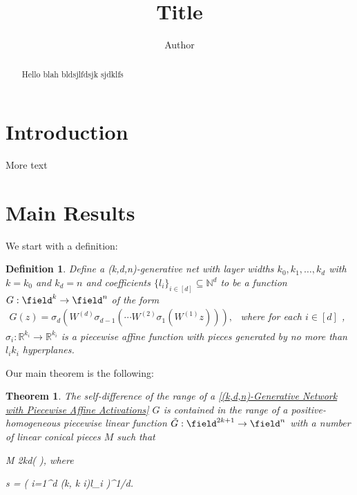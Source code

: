 \documentclass{article}
\title{Title}
\author{Author}
\newtheorem{theorem}{Theorem}
\newtheorem{definition}{Definition}
\begin{document}
\maketitle
\begin{abstract}
Hello blah bldsjlfdsjk sjdklfs

\end{abstract}

\section{Introduction}\label{section:Introduction}
More text
\section{Main Results}\label{section:Main Results}
We start with a definition:
\begin{definition}
\label{(k,d,n)-Generative Network with Piecewise Affine Activations}
Define a (k,d,n)-generative net with layer widths  $k_{0}, k_1, \dots, k_{d}$  with  $k = k_0$  and  $k_d = n$  and coefficients  $\{ l_i \}_{i \in [d]}\subseteq \mathbb{N}^d$  to be a function  $G:\field^k \to \field^n$  of the form
$
\begin{align*}
G(z) = \sigma_d \left( W^{(d)} \sigma_{d-1}\left( \cdots W^{(2)} \sigma_1 \left( W^{(1)} z \right) \right)\right), 
\end{align*}$
where for each  $i \in [d]$ ,   $\sigma_i:\mathbb{R}^{k_i}\to\mathbb{R}^{k_i}$  is a piecewise affine function with pieces generated by no more than  $l_i k_i$  hyperplanes.

\end{definition}
Our main theorem is the following:
\begin{theorem}
\label{Self-Difference of Affine Neural Net is Contained in Conical Piecewise Linear Function with Counted Pieces}
The self-difference of the range of a \autoref{(k,d,n)-Generative Network with Piecewise Affine Activations}  $G$  is contained in the range of a positive-homogeneous piecewise linear function  $\tilde{G}:\field^{2k+1}\to \field^{n}$  with a number of linear conical pieces  $M$  such that 

\log M \leq 2kd\log\left(  \right),  
where

s = \left( \prod \textit{{i=1}^d \max(k, k} i)l_i \right)^{1/d}.  

\end{theorem}
\end{document}
